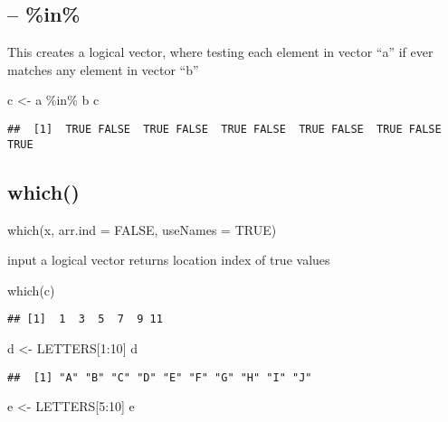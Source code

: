 \documentclass[
]{book}
\newenvironment{Shaded}{\begin{snugshade}}{\end{snugshade}}
\newcommand{\DecValTok}[1]{\textcolor[rgb]{0.00,0.00,0.81}{#1}}
\newcommand{\FunctionTok}[1]{\textcolor[rgb]{0.00,0.00,0.00}{#1}}
\newcommand{\NormalTok}[1]{#1}
\newcommand{\OtherTok}[1]{\textcolor[rgb]{0.56,0.35,0.01}{#1}}
\newcommand{\SpecialCharTok}[1]{\textcolor[rgb]{0.00,0.00,0.00}{#1}}
\begin{document}
\hypertarget{in}{%
\subsection{-- \%in\%}\label{in}}

This creates a logical vector, where testing each element in vector ``a''
if ever matches any element in vector ``b''

\begin{Shaded}
\begin{Highlighting}[]
\NormalTok{c }\OtherTok{\textless{}{-}}\NormalTok{ a }\SpecialCharTok{\%in\%}\NormalTok{ b}
\NormalTok{c}
\end{Highlighting}
\end{Shaded}

\begin{verbatim}
##  [1]  TRUE FALSE  TRUE FALSE  TRUE FALSE  TRUE FALSE  TRUE FALSE  TRUE
\end{verbatim}

\hypertarget{which}{%
\subsection{which()}\label{which}}

which(x, arr.ind = FALSE, useNames = TRUE)

input a logical vector returns location index of true values

\begin{Shaded}
\begin{Highlighting}[]
\FunctionTok{which}\NormalTok{(c)}
\end{Highlighting}
\end{Shaded}

\begin{verbatim}
## [1]  1  3  5  7  9 11
\end{verbatim}

\begin{Shaded}
\begin{Highlighting}[]
\NormalTok{d }\OtherTok{\textless{}{-}}\NormalTok{ LETTERS[}\DecValTok{1}\SpecialCharTok{:}\DecValTok{10}\NormalTok{]}
\NormalTok{d}
\end{Highlighting}
\end{Shaded}

\begin{verbatim}
##  [1] "A" "B" "C" "D" "E" "F" "G" "H" "I" "J"
\end{verbatim}

\begin{Shaded}
\begin{Highlighting}[]
\NormalTok{e }\OtherTok{\textless{}{-}}\NormalTok{ LETTERS[}\DecValTok{5}\SpecialCharTok{:}\DecValTok{10}\NormalTok{]}
\NormalTok{e}
\end{Highlighting}
\end{Shaded}
\end{document}

